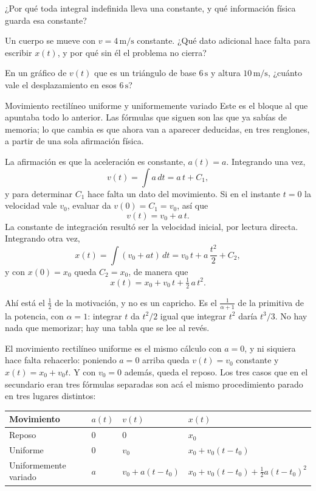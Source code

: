 \documentclass[11pt,openany]{book}
\begin{document}
\begin{chequeo}
\item ¿Por qué toda integral indefinida lleva una constante, y qué información física guarda esa constante?
\item Un cuerpo se mueve con $v = 4\,\mathrm{m/s}$ constante. ¿Qué dato adicional hace falta para escribir $x(t)$, y por qué sin él el problema no cierra?
\item En un gráfico de $v(t)$ que es un triángulo de base $6\,\mathrm{s}$ y altura $10\,\mathrm{m/s}$, ¿cuánto vale el desplazamiento en esos $6\,\mathrm{s}$?
\end{chequeo}

\begin{bloque}{Movimiento rectilíneo uniforme y uniformemente variado}
Este es el bloque al que apuntaba todo lo anterior. Las fórmulas que siguen son las que ya sabías de memoria; lo que cambia es que ahora van a aparecer deducidas, en tres renglones, a partir de una sola afirmación física.

La afirmación es que la aceleración es constante, $a(t)=a$. Integrando una vez,
\[
v(t) = \int a\,dt = a\,t + C_1,
\]
y para determinar $C_1$ hace falta un dato del movimiento. Si en el instante $t=0$ la velocidad vale $v_0$, evaluar da $v(0)=C_1=v_0$, así que
\[
v(t) = v_0 + a\,t.
\]
La constante de integración resultó ser la velocidad inicial, por lectura directa. Integrando otra vez,
\[
x(t) = \int (v_0 + a t)\,dt = v_0\,t + a\,\frac{t^2}{2} + C_2,
\]
y con $x(0)=x_0$ queda $C_2 = x_0$, de manera que
\[
x(t) = x_0 + v_0\,t + \tfrac12\,a\,t^2.
\]

Ahí está el $\tfrac12$ de la motivación, y no es un capricho. Es el $\tfrac{1}{\alpha+1}$ de la primitiva de la potencia, con $\alpha=1$: integrar $t$ da $t^2/2$ igual que integrar $t^2$ daría $t^3/3$. No hay nada que memorizar; hay una tabla que se lee al revés.

El movimiento rectilíneo uniforme es el mismo cálculo con $a=0$, y ni siquiera hace falta rehacerlo: poniendo $a=0$ arriba queda $v(t)=v_0$ constante y $x(t)=x_0+v_0t$. Y con $v_0=0$ además, queda el reposo. Los tres casos que en el secundario eran tres fórmulas separadas son acá el mismo procedimiento parado en tres lugares distintos:

\begin{center}
\begin{tabular}{llll}
\toprule
Movimiento & $a(t)$ & $v(t)$ & $x(t)$ \\
\midrule
Reposo & $0$ & $0$ & $x_0$ \\
Uniforme & $0$ & $v_0$ & $x_0 + v_0(t-t_0)$ \\
Uniformemente variado & $a$ & $v_0 + a(t-t_0)$ & $x_0 + v_0(t-t_0) + \tfrac12 a (t-t_0)^2$ \\
\bottomrule
\end{tabular}
\end{center}


\end{bloque}
\end{document}
